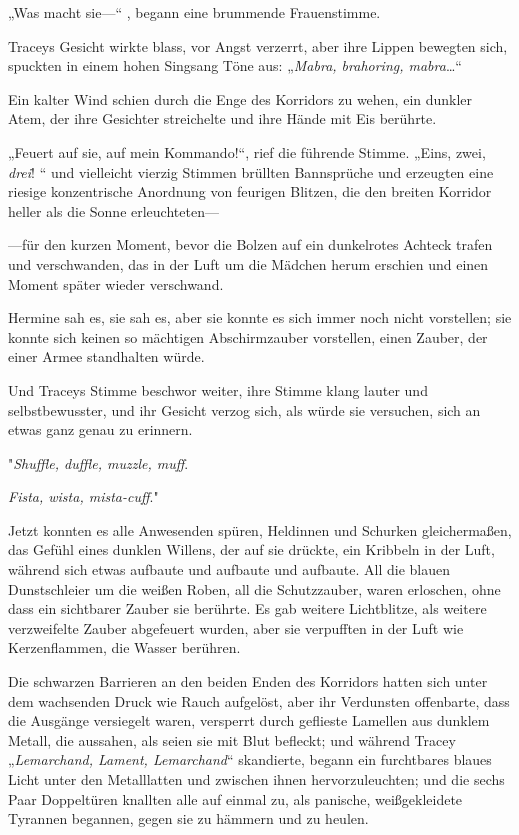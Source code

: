 {„Was macht sie—“ , begann eine brummende Frauenstimme.

Traceys Gesicht wirkte blass, vor Angst verzerrt, aber ihre Lippen bewegten sich, spuckten in einem hohen Singsang Töne aus: „\emph{Mabra, brahoring, mabra}…“

Ein kalter Wind schien durch die Enge des Korridors zu wehen, ein dunkler Atem, der ihre Gesichter streichelte und ihre Hände mit Eis berührte.

„Feuert auf sie, auf mein Kommando!“, rief die führende Stimme. „Eins, zwei, \emph{drei}! “ und vielleicht vierzig Stimmen brüllten Bannsprüche und erzeugten eine riesige konzentrische Anordnung von feurigen Blitzen, die den breiten Korridor heller als die Sonne erleuchteten—

—für den kurzen Moment, bevor die Bolzen auf ein dunkelrotes Achteck trafen und verschwanden, das in der Luft um die Mädchen herum erschien und einen Moment später wieder verschwand.

Hermine sah es, sie sah es, aber sie konnte es sich immer noch nicht vorstellen; sie konnte sich keinen so mächtigen Abschirmzauber vorstellen, einen Zauber, der einer Armee standhalten würde.

Und Traceys Stimme beschwor weiter, ihre Stimme klang lauter und selbstbewusster, und ihr Gesicht verzog sich, als würde sie versuchen, sich an etwas ganz genau zu erinnern.

"\emph{Shuffle, duffle, muzzle, muff}.

\emph{Fista, wista, mista-cuff}."

Jetzt konnten es alle Anwesenden spüren, Heldinnen und Schurken gleichermaßen, das Gefühl eines dunklen Willens, der auf sie drückte, ein Kribbeln in der Luft, während sich etwas aufbaute und aufbaute und aufbaute. All die blauen Dunstschleier um die weißen Roben, all die Schutzzauber, waren erloschen, ohne dass ein sichtbarer Zauber sie berührte. Es gab weitere Lichtblitze, als weitere verzweifelte Zauber abgefeuert wurden, aber sie verpufften in der Luft wie Kerzenflammen, die Wasser berühren.

Die schwarzen Barrieren an den beiden Enden des Korridors hatten sich unter dem wachsenden Druck wie Rauch aufgelöst, aber ihr Verdunsten offenbarte, dass die Ausgänge versiegelt waren, versperrt durch geflieste Lamellen aus dunklem Metall, die aussahen, als seien sie mit Blut befleckt; und während Tracey „\emph{Lemarchand, Lament, Lemarchand}“ skandierte, begann ein furchtbares blaues Licht unter den Metalllatten und zwischen ihnen hervorzuleuchten; und die sechs Paar Doppeltüren knallten alle auf einmal zu, als panische, weißgekleidete Tyrannen begannen, gegen sie zu hämmern und zu heulen.

}
